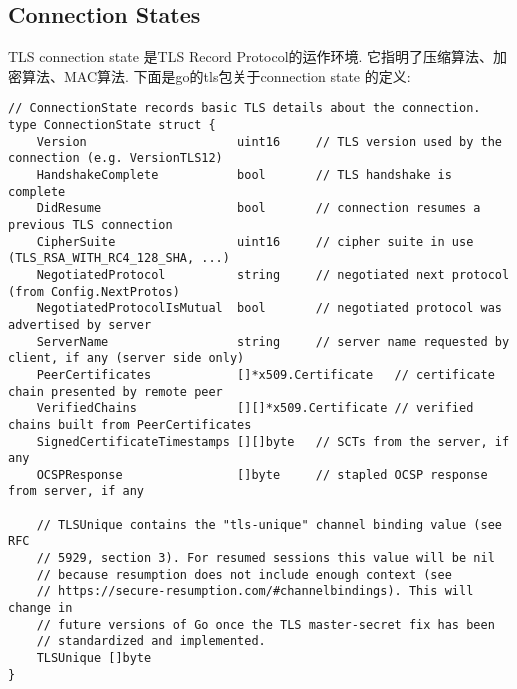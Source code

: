 \documentclass[a4paper]{ctexart}
\begin{document}
\subsection{Connection States}

TLS connection state 是TLS Record Protocol的运作环境. 它指明了压缩算法、加密算法、MAC算法. 下面是go的tls包关于connection state 的定义: 
\begin{lstlisting}[frame=single, stepnumber=5, firstnumber=1, caption={Go中connection的定义}]
 // ConnectionState records basic TLS details about the connection.
type ConnectionState struct {
	Version                     uint16     // TLS version used by the connection (e.g. VersionTLS12)
	HandshakeComplete           bool       // TLS handshake is complete
	DidResume                   bool       // connection resumes a previous TLS connection
	CipherSuite                 uint16     // cipher suite in use (TLS_RSA_WITH_RC4_128_SHA, ...)
	NegotiatedProtocol          string     // negotiated next protocol (from Config.NextProtos)
	NegotiatedProtocolIsMutual  bool       // negotiated protocol was advertised by server
	ServerName                  string     // server name requested by client, if any (server side only)
	PeerCertificates            []*x509.Certificate   // certificate chain presented by remote peer
	VerifiedChains              [][]*x509.Certificate // verified chains built from PeerCertificates
	SignedCertificateTimestamps [][]byte   // SCTs from the server, if any
	OCSPResponse                []byte     // stapled OCSP response from server, if any

	// TLSUnique contains the "tls-unique" channel binding value (see RFC
	// 5929, section 3). For resumed sessions this value will be nil
	// because resumption does not include enough context (see
	// https://secure-resumption.com/#channelbindings). This will change in
	// future versions of Go once the TLS master-secret fix has been
	// standardized and implemented.
	TLSUnique []byte
}
\end{lstlisting}
\end{document}
